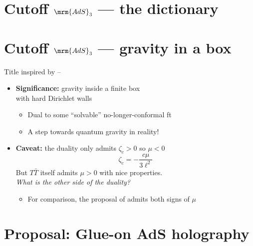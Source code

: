 \documentclass[11pt]{article}
\renewenvironment{frame}[1]%
	{\section*{#1}}%
	{}
\newcommand{\TTbar}{\texorpdfstring{\ensuremath{T\bar{T}}}{TTbar}\xspace}
\begin{document}
\begin{multicols}{3}
\begin{frame}{Cutoff $\mrm{AdS}_3$ --- the dictionary}{}
\begin{itemize}
	\end{itemize}

\end{frame}


\begin{frame}{Cutoff $\mrm{AdS}_3$ --- gravity in a box}{%
	Title inspired by
	\textcite{Kraus:2021cwf} -- %
}

\begin{itemize}
\item \textbf{Significance:} gravity inside a finite box\\
	with hard Dirichlet walls

\begin{itemize}
	\item Dual to some ``solvable'' no-longer-conformal ft
	\item A step towards quantum gravity in reality!
\end{itemize}


\item \textbf{Caveat:} the duality only admits $\zeta_c > 0$ so $\mu < 0$
\begin{equation}
	\zeta_c = - \frac{c \mu}{3\ell^2}
\end{equation}
But \TTbar itself admits $\mu > 0$ with nice properties.\\
\textit{What is the other side of the duality?}
	\begin{itemize}
	\item For comparison, the proposal of \textcite{Guica:2019nzm} admits both signs of $\mu$
	\end{itemize}
\end{itemize}

\end{frame}

\section{\textbf{Proposal:} Glue-on AdS holography} \label{se:glueonproposal}


\end{multicols}
\end{document}

